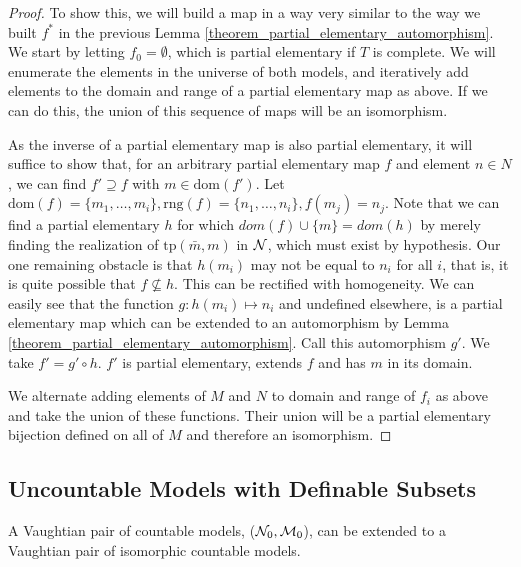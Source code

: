 \begin{proof}
To show this, we will build a map in a way very similar to the way we built \(f^*\) in the previous Lemma \ref{theorem_partial_elementary_automorphism}.
We start by letting \(f_0 = \emptyset\), which is partial elementary if \(T\) is complete.
We will enumerate the elements in the universe of both models, and iteratively add elements to the domain and range of a partial elementary map as above.
If we can do this, the union of this sequence of maps will be an isomorphism.

As the inverse of a partial elementary map is also partial elementary, it will suffice to show that, for an arbitrary  partial elementary map \(f\) and element \(n \in N\), we can find \(f'\supseteq f\) with \(m \in \text{dom}(f')\).
Let \(\text{dom}(f) = \{m_1, \ldots, m_i\}, \text{rng}(f) = \{n_1, \ldots, n_i\}, f(m_j) = n_j\).
Note that we can find a partial elementary \(h\) for which \(dom(f) \cup \{m\} =  dom(h)\) by merely finding the realization of \(\text{tp}(\bar{m}, m)\) in \(\mathcal{N}\), which must exist by hypothesis.
Our one remaining obstacle is that \(h(m_i)\) may not be equal to \(n_i\) for all \(i\), that is, it is quite possible that \(f \not \subseteq h\). 
This can be rectified with homogeneity. 
We can easily see that the function \(g: h(m_i) \mapsto n_i\) and undefined elsewhere, is a partial elementary map which can be extended to an automorphism by Lemma \ref{theorem_partial_elementary_automorphism}. 
Call this automorphism \(g'\). 
We take \(f' = g' \circ h\).
\(f'\) is partial elementary, extends \(f\) and has \(m\) in its domain.   

We alternate adding elements of \(M\) and \(N\) to domain and range of \(f_i\) as above and take the union of these functions.
Their union will be a partial elementary bijection defined on all of \(M\) and therefore an isomorphism.
\end{proof}

\subsection{Uncountable Models with Definable Subsets}

\begin{theorem}\label{theorem_countable_isomorphic_vaughtian_pair}
A Vaughtian pair of countable models, (\(\mathcal{N}_0, \mathcal{M}_0\)), can be extended to a Vaughtian pair of isomorphic countable models.
\end{theorem}


